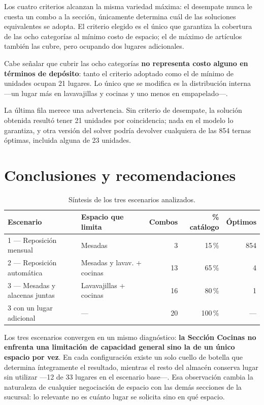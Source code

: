 \documentclass[10pt,a4paper]{article}
\begin{document}
Los cuatro criterios alcanzan la misma variedad máxima: el desempate nunca le
cuesta un combo a la sección, únicamente determina cuál de las soluciones
equivalentes se adopta. El criterio elegido es el único que garantiza la
cobertura de las ocho categorías al mínimo costo de espacio; el de máximo de
artículos también las cubre, pero ocupando dos lugares adicionales.

Cabe señalar que cubrir las ocho categorías \textbf{no representa costo alguno
en términos de depósito}: tanto el criterio adoptado como el de mínimo de
unidades ocupan 21 lugares. Lo único que se modifica es la distribución interna
—un lugar más en lavavajillas y cocinas y uno menos en empapelado—.

La última fila merece una advertencia. Sin criterio de desempate, la solución
obtenida resultó tener 21 unidades por coincidencia; nada en el modelo lo
garantiza, y otra versión del solver podría devolver cualquiera de las 854
ternas óptimas, incluida alguna de 23 unidades.

\section{Conclusiones y recomendaciones}
\label{sec:conclusiones}

\begin{table}[H]
\centering\small
\caption{Síntesis de los tres escenarios analizados.}
\label{tab:sintesis}
\begin{tabular}{llrrr}
\toprule
\textbf{Escenario} & \textbf{Espacio que limita} & \textbf{Combos} & \textbf{\% catálogo} & \textbf{Óptimos} \\
\midrule
1 — Reposición mensual        & Mesadas                        & 3  & 15\,\%  & 854 \\
2 — Reposición automática     & Mesadas y lavav. + cocinas     & 13 & 65\,\%  & 4 \\
3 — Mesadas y alacenas juntas & Lavavajillas + cocinas         & 16 & 80\,\%  & 1 \\
\midrule
3 con un lugar adicional      & ---                            & 20 & 100\,\% & --- \\
\bottomrule
\end{tabular}
\end{table}

Los tres escenarios convergen en un mismo diagnóstico: \textbf{la Sección
Cocinas no enfrenta una limitación de capacidad general sino la de un único
espacio por vez}. En cada configuración existe un solo cuello de botella que
determina íntegramente el resultado, mientras el resto del almacén conserva
lugar sin utilizar —12 de 33 lugares en el escenario base—. Esa observación
cambia la naturaleza de cualquier negociación de espacio con las demás secciones
de la sucursal: lo relevante no es cuánto lugar se solicita sino en qué espacio.
\end{document}
